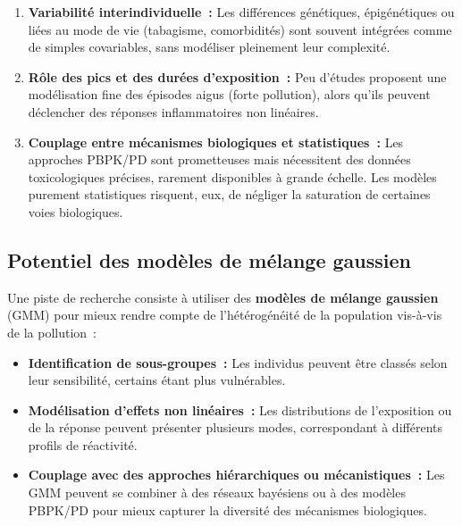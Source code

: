 \begin{enumerate}
	\item \textbf{Variabilité interindividuelle :} Les différences génétiques, épigénétiques ou liées au mode de vie (tabagisme, comorbidités) sont souvent intégrées comme de simples covariables, sans modéliser pleinement leur complexité.
	\item \textbf{Rôle des pics et des durées d’exposition :} Peu d’études proposent une modélisation fine des épisodes aigus (forte pollution), alors qu’ils peuvent déclencher des réponses inflammatoires non linéaires.
	\item \textbf{Couplage entre mécanismes biologiques et statistiques :} Les approches PBPK/PD sont prometteuses mais nécessitent des données toxicologiques précises, rarement disponibles à grande échelle. Les modèles purement statistiques risquent, eux, de négliger la saturation de certaines voies biologiques.
\end{enumerate}

\subsection{Potentiel des modèles de mélange gaussien}
Une piste de recherche consiste à utiliser des \textbf{modèles de mélange gaussien} (GMM) pour mieux rendre compte de l’hétérogénéité de la population vis-à-vis de la pollution :
\begin{itemize}
	\item \textbf{Identification de sous-groupes :} Les individus peuvent être classés selon leur sensibilité, certains étant plus vulnérables.
	\item \textbf{Modélisation d’effets non linéaires :} Les distributions de l’exposition ou de la réponse peuvent présenter plusieurs modes, correspondant à différents profils de réactivité.
	\item \textbf{Couplage avec des approches hiérarchiques ou mécanistiques :} Les GMM peuvent se combiner à des réseaux bayésiens ou à des modèles PBPK/PD pour mieux capturer la diversité des mécanismes biologiques.
\end{itemize}

